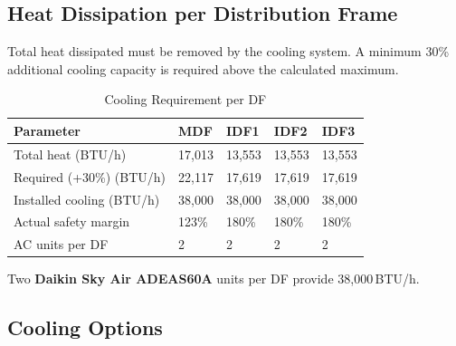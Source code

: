 \documentclass[12pt,a4paper]{report}
\begin{document}
\subsection{Heat Dissipation per Distribution Frame}

Total heat dissipated must be removed by the cooling system.
A minimum 30\% additional cooling capacity is required above the calculated maximum.

\begin{table}[H]
  \centering
  \caption{Cooling Requirement per DF}
  \label{tab:cooling_calc}
  \begin{tabular}{L{5.5cm} R{2cm} R{2cm} R{2cm} R{2cm}}
    \toprule
    \textbf{Parameter} & \textbf{MDF} & \textbf{IDF1} & \textbf{IDF2} & \textbf{IDF3} \\
    \midrule
    Total heat (BTU/h)              & 17{,}013 & 13{,}553 & 13{,}553 & 13{,}553 \\
    Required (+30\%) (BTU/h)        & 22{,}117 & 17{,}619 & 17{,}619 & 17{,}619 \\
    Installed cooling (BTU/h)       & 38{,}000 & 38{,}000 & 38{,}000 & 38{,}000 \\
    Actual safety margin            & 123\%    & 180\%    & 180\%    & 180\% \\
    AC units per DF                 & 2        & 2        & 2        & 2 \\
    \bottomrule
  \end{tabular}
\end{table}

Two \textbf{Daikin Sky Air ADEAS60A} units per DF provide 38{,}000\,BTU/h.

\subsection{Cooling Options}
\end{document}
